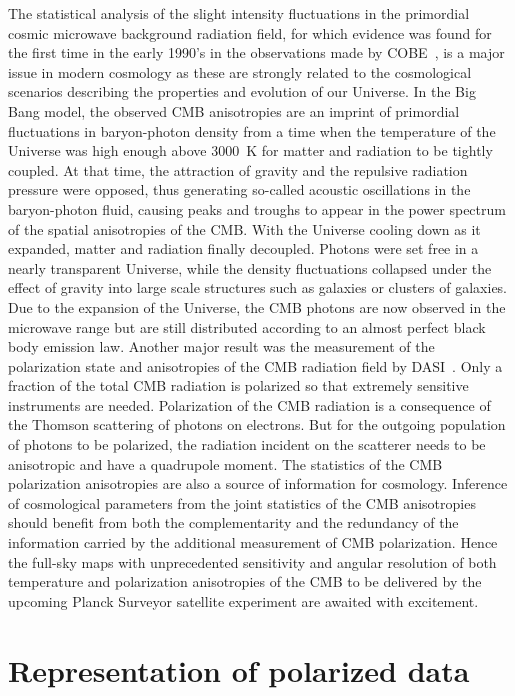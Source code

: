 The statistical analysis of the slight intensity fluctuations in the primordial cosmic microwave background radiation field, for which evidence was 
found for the first time in the early 1990's in the observations made by COBE~\citep{gauss:smoot92}, is a major issue in modern cosmology as these 
are strongly related to the cosmological scenarios describing the properties and evolution of our Universe. In the Big Bang model, the observed CMB 
anisotropies are an imprint of primordial fluctuations in baryon-photon density from a time when the temperature of the Universe was high enough above 
3000~K for matter and radiation to be tightly coupled. At that time, the attraction of gravity and the repulsive radiation pressure were opposed, thus 
generating so-called acoustic oscillations in the baryon-photon fluid, causing peaks and troughs to appear in the power spectrum of the spatial anisotropies 
of the CMB. With the Universe cooling down as it expanded, matter and radiation finally decoupled. Photons were set free in a nearly transparent Universe, 
while the density fluctuations collapsed under the effect of gravity into large scale structures such as galaxies or clusters of galaxies. Due to the 
expansion of the Universe, the CMB photons are now observed in the microwave range but are still distributed according to an almost perfect black body 
emission law. Another major result was the measurement of the polarization state and anisotropies of the CMB radiation field by DASI~\citep{dasi}. 
Only a fraction of the total CMB radiation is polarized so that extremely sensitive instruments are needed. Polarization of the CMB radiation is a 
consequence of the Thomson scattering of photons on electrons. But for the outgoing population of photons to be polarized, the radiation incident on 
the scatterer needs to be anisotropic and have a quadrupole moment. The statistics of the CMB polarization anisotropies are also a source of information 
for cosmology. Inference of cosmological parameters from the joint statistics of the CMB anisotropies should benefit from both the complementarity and 
the redundancy of the information carried by the additional measurement of CMB polarization. Hence the full-sky maps with unprecedented sensitivity and 
angular resolution of both temperature and polarization anisotropies of the CMB to be delivered by the upcoming Planck Surveyor satellite experiment are 
awaited with excitement.

  

\section{Representation of polarized data}

